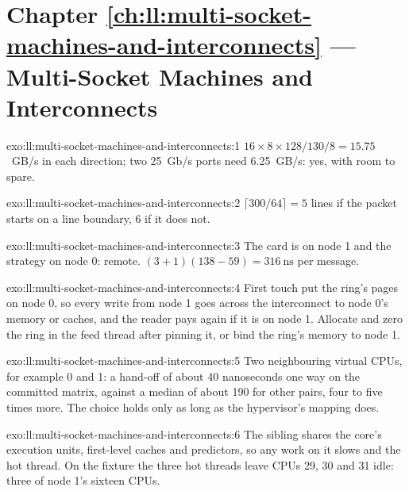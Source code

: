 \section*{Chapter \ref{ch:ll:multi-socket-machines-and-interconnects} --- Multi-Socket Machines and Interconnects}

\begin{solution}{exo:ll:multi-socket-machines-and-interconnects:1}
$16 \times 8 \times 128/130/8 = 15.75$~GB/s in each direction; two 25~Gb/s ports need 6.25~GB/s: yes, with room to spare.
\end{solution}

\begin{solution}{exo:ll:multi-socket-machines-and-interconnects:2}
$\lceil 300/64 \rceil = 5$ lines if the packet starts on a line boundary, 6 if it does not.
\end{solution}

\begin{solution}{exo:ll:multi-socket-machines-and-interconnects:3}
The card is on node 1 and the strategy on node 0: remote. $(3 + 1)(138 - 59) = \qty{316}{\nano\second}$ per message.
\end{solution}

\begin{solution}{exo:ll:multi-socket-machines-and-interconnects:4}
First touch put the ring's pages on node 0, so every write from node 1 goes across the interconnect to node 0's memory or
caches, and the reader pays again if it is on node 1. Allocate and zero the ring in the feed thread after pinning it, or
bind the ring's memory to node 1.
\end{solution}

\begin{solution}{exo:ll:multi-socket-machines-and-interconnects:5}
Two neighbouring virtual CPUs, for example 0 and 1: a hand-off of about 40 nanoseconds one way on the committed
matrix, against a median of about 190 for other pairs, four to five times more. The choice holds only as long as the
hypervisor's mapping does.
\end{solution}

\begin{solution}{exo:ll:multi-socket-machines-and-interconnects:6}
The sibling shares the core's execution units, first-level caches and predictors, so any work on it slows and  the
hot thread. On the fixture the three hot threads leave CPUs 29, 30 and 31 idle: three of node 1's sixteen CPUs.
\end{solution}

